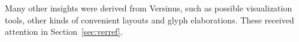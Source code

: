 																																																																																																																																																																																																																																																																																																																																																																																																															Many other insights were derived from Versinus, such as possible visualization tools, other kinds of convenient layouts and glyph elaborations.
																																																																																																																																																																																																																																																																																																																																																																																																															These received attention in Section~\ref{sec:verref}.


